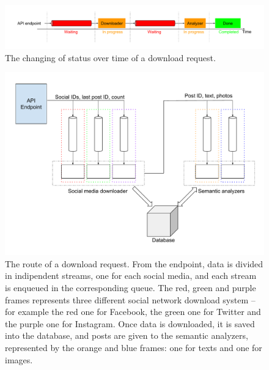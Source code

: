 \begin{figure}
\centering
\includegraphics[width=%
1\textwidth]{img/DownloadStatuses}
\caption{The changing of status over time of a download request.}
\label{fig:statuses}
\end{figure}

\begin{figure}
\centering
\includegraphics[width=%
1\textwidth]{img/Queues}
\caption{The route of a download request. From the endpoint, data is divided in indipendent streams, one for each social media, and each stream is enqueued in the corresponding queue. The red, green and purple frames represents three different social network download system -- for example the red one for Facebook, the green one for Twitter and the purple one for Instagram. Once data is downloaded, it is saved into the database, and posts are given to the semantic analyzers, represented by the orange and blue frames: one for texts and one for images.}
\label{fig:queues}
\end{figure}

